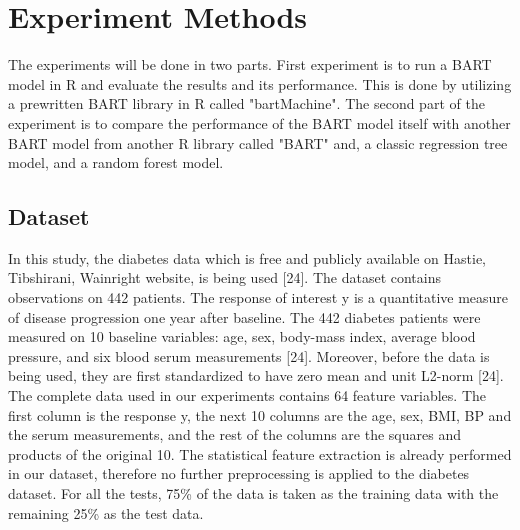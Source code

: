 \documentclass{usiinftr}
\begin{document}
\section{Experiment Methods}
The experiments will be done in two parts. First experiment is to run a BART model in R and evaluate the results and its performance. This is done by utilizing a prewritten BART library in R called "bartMachine". The second part of the experiment is to compare the performance of the BART model itself with another BART model from another R library called "BART" and, a classic regression tree model, and a random forest model.

\subsection{Dataset}\label{dataset}
In this study, the diabetes data which is free and publicly available on Hastie, Tibshirani,
Wainright website, is being used [24]. The dataset contains observations on 442 patients. The response of interest y is a quantitative measure of disease progression one year after baseline. The 442 diabetes patients were measured on 10 baseline variables:  age, sex, body-mass index, average blood pressure, and six blood serum measurements [24]. Moreover, before the data is being used, they are first standardized to have zero mean and unit L2-norm [24]. The complete data used in our experiments contains 64 feature variables. The first column is the response y, the next 10 columns are the age, sex, BMI, BP and the serum measurements, and the rest of the columns are the squares and products of the original 10. The statistical feature extraction is already performed in our dataset, therefore no further preprocessing is applied to the diabetes dataset. For all the tests, 75\% of the data is taken as the training data with the remaining 25\% as the test data.
\end{document}
